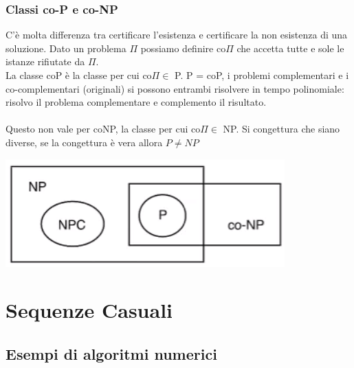 \documentclass[10pt]{book}
\begin{document}
\subsection{Classi co-P e co-NP}
C'è molta differenza tra certificare l'esistenza e certificare la non esistenza di una soluzione. Dato un problema $\Pi$ possiamo definire co$\Pi$ che accetta tutte e sole le istanze rifiutate da $\Pi$.\\
La classe coP è la classe per cui co$\Pi\in$ P. P = coP, i problemi complementari e i co-complementari (originali) si possono entrambi risolvere in tempo polinomiale: risolvo il problema complementare e complemento il risultato.\\\\
Questo non vale per coNP, la classe per cui co$\Pi\in$ NP. Si congettura che siano diverse, se la congettura è vera allora $P\neq NP$
\begin{center}
	\includegraphics[scale=0.5]{5.png}
\end{center}
\chapter{Sequenze Casuali}
\section{Esempi di algoritmi numerici}
\end{document}
